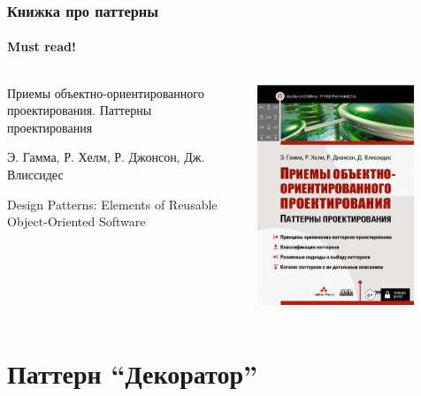 \documentclass[xetex,mathserif,serif]{beamer}
\begin{document}
    \begin{frame}
        \frametitle{Книжка про паттерны}
        \framesubtitle{Must read!}

        \begin{columns}
            \begin{column}{0.6\textwidth}
                Приемы объектно-ориентированного проектирования. Паттерны проектирования

                Э. Гамма, Р. Хелм, Р. Джонсон, Дж. Влиссидес

                Design Patterns: Elements of Reusable Object-Oriented Software
            \end{column}
            \begin{column}{0.4\textwidth}
                \begin{center}
                    \includegraphics[width=0.8\textwidth]{patternBookCover.png}
                \end{center}
            \end{column}
        \end{columns}
    \end{frame}

    \section{Паттерн ``Декоратор''}
\end{document}
